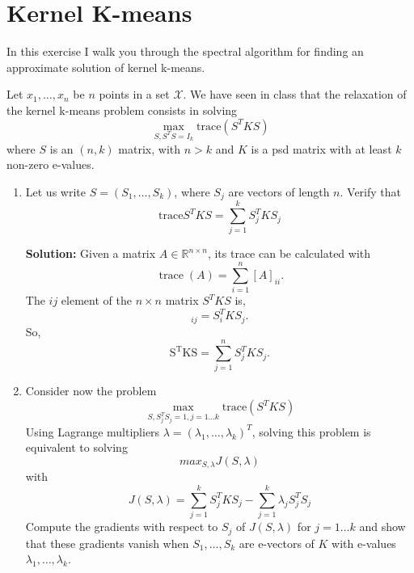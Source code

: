 \documentclass{article}[12pt]
\begin{document}
 \section{Kernel K-means}
 
 In this exercise I walk you through the spectral algorithm for finding an approximate solution of kernel k-means. 
 
 Let $x_1,\ldots,x_n$ be $n$ points in a set $\mathcal{X}$. We have seen in class that the relaxation of the kernel k-means problem consists in solving 
 \begin{equation}
 \label{eq:kmeans}
 \max_{S,S^T S=I_k} \mbox{trace}\left(S^T K S\right)
 \end{equation}
 where $S$ is an $(n,k)$ matrix, with $n>k$ and $K$ is a psd matrix with at least $k$ non-zero e-values. 
 \begin{enumerate}
 \item Let us write $S=(S_1,\ldots,S_k)$, where $S_j$ are vectors of length $n$. 
 Verify that 
 \begin{equation}
 \mbox{trace}S^TKS = \sum_{j=1}^k S_j^T K S_j
 \end{equation}

 \textbf{Solution:} Given a matrix $A \in \mathbb R^{n \times n}$, its trace can be calculated with
 \begin{equation}
	 \operatorname{trace}(A) = \sum^{n}_{i=1} [A]_{ii}. 
 \end{equation}
 The $ij$ element of the $n\times n$ matrix $S^T KS$ is,
 \begin{equation}
	 [S^T K S]_{ij} = S_i^T K S_j.
 \end{equation}
 So,
 \begin{equation}
	 \operatorname{S^T K S}= \sum^{n}_{j=1} S_j^T K S_j. 
 \end{equation}

\item  Consider now the problem 
 \begin{equation}
 \label{eq:2}
 \max_{S,S_j^TS_j=1,j=1\ldots k} \mbox{trace}\left(S^TKS\right)
 \end{equation}
 Using Lagrange multipliers $\lambda=(\lambda_1,\ldots,\lambda_k)^T$, solving this problem is equivalent to solving 
 \begin{equation}
 max_{S,\lambda} J(S,\lambda) 
 \end{equation}
 with 
 \begin{equation}
 J(S,\lambda) =  \sum_{j=1}^k S_j^T K S_j - \sum_{j=1}^k \lambda_j S_j^TS_j
 \end{equation}
  Compute the gradients with respect to $S_j$ of $J(S,\lambda)$ for $j=1\ldots k$ and show that these gradients vanish when $S_1,\ldots,S_k$ are e-vectors of $K$ with e-values $\lambda_1,\ldots,\lambda_k$. 


\end{enumerate}
\end{document}
